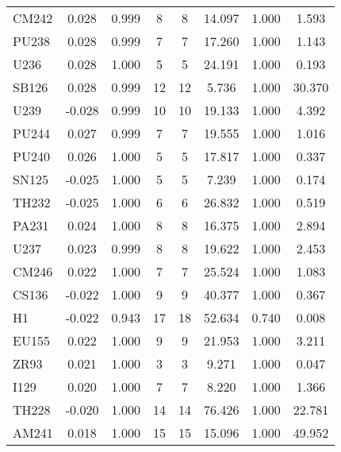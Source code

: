 \begin{tabular}{|l|ccccccc|}
CM242 & 0.028 & 0.999 & 8 & 8 & 14.097 & 1.000 & 1.593\\
PU238 & 0.028 & 0.999 & 7 & 7 & 17.260 & 1.000 & 1.143\\
U236 & 0.028 & 1.000 & 5 & 5 & 24.191 & 1.000 & 0.193\\
SB126 & 0.028 & 0.999 & 12 & 12 & 5.736 & 1.000 & 30.370\\
U239 & -0.028 & 0.999 & 10 & 10 & 19.133 & 1.000 & 4.392\\
PU244 & 0.027 & 0.999 & 7 & 7 & 19.555 & 1.000 & 1.016\\
PU240 & 0.026 & 1.000 & 5 & 5 & 17.817 & 1.000 & 0.337\\
SN125 & -0.025 & 1.000 & 5 & 5 & 7.239 & 1.000 & 0.174\\
TH232 & -0.025 & 1.000 & 6 & 6 & 26.832 & 1.000 & 0.519\\
PA231 & 0.024 & 1.000 & 8 & 8 & 16.375 & 1.000 & 2.894\\
U237 & 0.023 & 0.999 & 8 & 8 & 19.622 & 1.000 & 2.453\\
CM246 & 0.022 & 1.000 & 7 & 7 & 25.524 & 1.000 & 1.083\\
CS136 & -0.022 & 1.000 & 9 & 9 & 40.377 & 1.000 & 0.367\\
H1 & -0.022 & 0.943 & 17 & 18 & 52.634 & 0.740 & 0.008\\
EU155 & 0.022 & 1.000 & 9 & 9 & 21.953 & 1.000 & 3.211\\
ZR93 & 0.021 & 1.000 & 3 & 3 & 9.271 & 1.000 & 0.047\\
I129 & 0.020 & 1.000 & 7 & 7 & 8.220 & 1.000 & 1.366\\
TH228 & -0.020 & 1.000 & 14 & 14 & 76.426 & 1.000 & 22.781\\
AM241 & 0.018 & 1.000 & 15 & 15 & 15.096 & 1.000 & 49.952\\
\hline
\end{tabular}